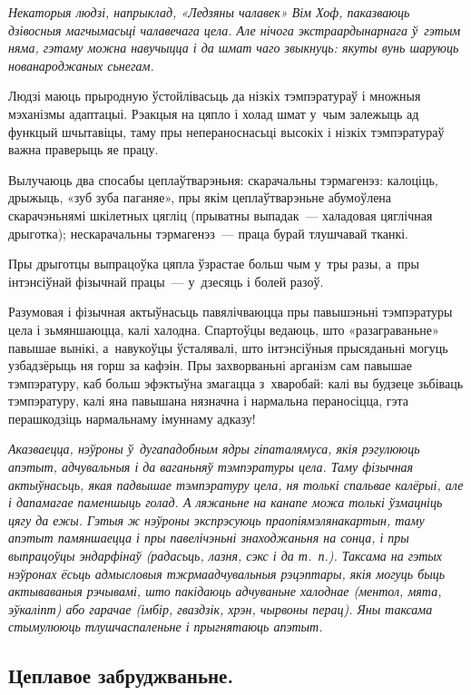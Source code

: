 \emph{Некаторыя людзі, напрыклад, «Ледзяны чалавек» Вім Хоф, паказваюць дзівосныя магчымасьці чалавечага цела. Але нічога экстраардынарнага ў~гэтым няма, гэтаму можна навучыцца і да шмат чаго звыкнуць: якуты вунь шаруюць нованароджаных сьнегам.}

Людзі маюць прыродную ўстойлівасьць да нізкіх тэмпэратураў і множныя мэханізмы адаптацыі. Рэакцыя на цяпло і холад шмат у~чым залежыць ад функцый шчытавіцы, таму пры непераноснасьці высокіх і нізкіх тэмпэратураў важна праверыць яе працу.

Вылучаюць два спосабы цеплаўтварэньня: скарачальны тэрмагенэз: калоціць, дрыжыць, «зуб зуба паганяе», пры якім цеплаўтварэньне абумоўлена скарачэньнямі шкілетных цягліц (прыватны выпадак~--- халадовая цяглічная дрыготка); нескарачальны тэрмагенэз~--- праца бурай тлушчавай тканкі.

Пры дрыготцы выпрацоўка цяпла ўзрастае больш чым у~тры разы, а~пры інтэнсіўнай фізычнай працы~--- у~дзесяць і болей разоў.

Разумовая і фізычная актыўнасьць павялічваюцца пры павышэньні тэмпэратуры цела і зьмяншаюцца, калі халодна. Спартоўцы ведаюць, што «разаграваньне» павышае вынікі, а~навукоўцы ўсталявалі, што інтэнсіўныя прысяданьні могуць узбадзёрыць ня горш за кафэін. Пры захворваньні арганізм сам павышае тэмпэратуру, каб больш эфэктыўна змагацца з~хваробай: калі вы будзеце зьбіваць тэмпэратуру, калі яна павышана нязначна і нармальна пераносіцца, гэта перашкодзіць нармальнаму імуннаму адказу!

\emph{Аказваецца, нэўроны ў~дугападобным ядры гіпаталямуса, якія рэгулююць апэтыт, адчувальныя і да ваганьняў тэмпэратуры цела. Таму фізычная актыўнасьць, якая падвышае тэмпэратуру цела, ня толькі спальвае калёрыі, але і дапамагае паменшыць голад. А ляжаньне на канапе можа толькі ўзмацніць цягу да ежы. Гэтыя ж нэўроны экспрэсуюць праопіямэлянакартын, таму апэтыт памяншаецца і пры павелічэньні знаходжаньня на сонца, і пры выпрацоўцы эндарфінаў (радасьць, лазня, сэкс і да т.~п.). Таксама на гэтых нэўронах ёсьць адмысловыя тжрмаадчувальныя рэцэптары, якія могуць быць актываваныя рэчывамі, што пакідаюць адчуваньне халоднае (ментол, мята, эўкаліпт) або гарачае (імбір, гваздзік, хрэн, чырвоны перац). Яны таксама стымулююць тлушчаспаленьне і прыгнятаюць апэтыт.}

\subsection*{Цеплавое забруджваньне.}

